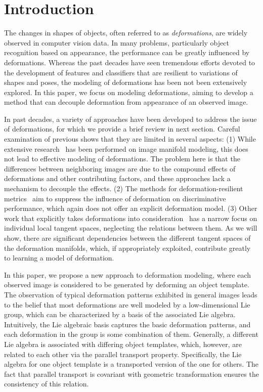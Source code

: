 
\section{Introduction}
\label{sec:introduction}

The changes in shapes of objects, often referred to as
\emph{deformations}, are widely observed in computer vision data.
In many problems, particularly object recognition based on appearance,
the performance can be greatly influenced by deformations. 
Whereas the past decades have seen tremendous efforts devoted to the
development of features and classifiers that are resilient to
variations of shapes and poses, the modeling of deformations has been
not been extensively explored. 
%
In this paper, we focus on modeling deformations, aiming to
develop a method that can decouple deformation from appearance of an
observed image. 

In past decades, a variety of approaches have been developed to
address the issue of deformations, for which we provide a brief review
in next section. Careful examination of previous shows that they are
limited in several aspects:
(1) While extensive research~\cite{ISO,LLE} has been performed on image
manifold modeling, this does not lead to effective modeling of deformations.
The problem here is that the differences between neighboring images
are due to the compound effects of deformations and other contributing
factors, and these approaches lack a mechanism to decouple the
effects.
(2) The methods for deformation-resilient
metrics~\cite{SC,IDM} aim to suppress the influence of deformation
on discriminative performance, which again does not offer an explicit
deformation model.
(3) Other work that explicitly takes deformations into
consideration~\cite{TD,HTrevor,ATV}
has a narrow focus on individual local tangent spaces, neglecting the
relations between them. As we will show, there are
significant dependencies between the different tangent spaces of the
deformation manifolds, which, if appropriately exploited,
contribute greatly to learning a model of deformation.

In this paper, we propose a new approach to deformation modeling,
where each observed image is considered to be generated by deforming
an object template. The observation of typical deformation patterns
exhibited in general images leads to the belief that most deformations
are well modeled by a low-dimensional Lie group, which can be characterized by
a basis of the associated Lie algebra. Intuitively, the Lie algebraic
basis captures the basic deformation patterns, and each deformation
in the group is some combination of them.
%
Generally, a different Lie algebra is associated with differing object
templates, which, however, are related to each other via the parallel
transport property. Specifically, the Lie algebra for one object
template is a transported version of the one for
others. The fact that parallel transport is covariant with geometric
transformation ensures the consistency of this relation.

